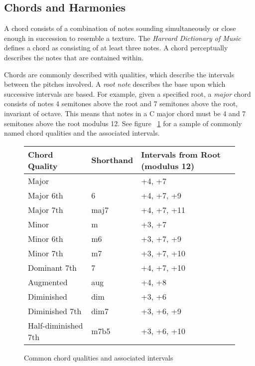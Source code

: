 \subsection{Chords and Harmonies}

A chord consists of a combination of notes sounding simultaneously or close enough in succession to resemble a texture. The \textit{Harvard Dictionary of Music} defines a chord as consisting of at least three notes\cite{harvdict}. A chord perceptually describes the notes that are contained within.

Chords are commonly described with qualities, which describe the intervals between the pitches involved. A \textit{root note} describes the base upon which successive intervals are based. For example, given a specified root, a \textit{major} chord consists of notes 4 semitones above the root and 7 semitones above the root, invariant of octave. This means that notes in a C major chord must be 4 and 7 semitones above the root modulus 12. See figure ~\ref{fig:qualitytable} for a sample of commonly named chord qualities and the associated intervals.

\begin{figure}[h!]
\begin{center}
\begin{tabular}{lll}
\toprule
Chord Quality       & Shorthand & Intervals from Root (modulus 12) \\
\midrule
Major               &           & +4, +7 \\
Major 6th           & 6         & +4, +7, +9 \\
Major 7th           & maj7      & +4, +7, +11 \\
Minor               & m         & +3, +7 \\
Minor 6th           & m6        & +3, +7, +9 \\
Minor 7th           & m7        & +3, +7, +10 \\
Dominant 7th        & 7         & +4, +7, +10 \\
Augmented           & aug       & +4, +8 \\
Diminished          & dim       & +3, +6 \\
Diminished 7th      & dim7      & +3, +6, +9 \\
Half-diminished 7th & m7b5      & +3, +6, +10 \\
\bottomrule
\end{tabular}
\caption{Common chord qualities and associated intervals}
\label{fig:qualitytable}
\end{center}
\end{figure}

